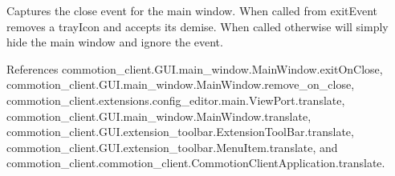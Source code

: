 \begin{DoxyVerb}Captures the close event for the main window. When called from exitEvent removes a trayIcon and accepts its demise. When called otherwise will simply hide the main window and ignore the event.
\end{DoxyVerb}
 

References commotion\+\_\+client.\+G\+U\+I.\+main\+\_\+window.\+Main\+Window.\+exit\+On\+Close, commotion\+\_\+client.\+G\+U\+I.\+main\+\_\+window.\+Main\+Window.\+remove\+\_\+on\+\_\+close, commotion\+\_\+client.\+extensions.\+config\+\_\+editor.\+main.\+View\+Port.\+translate, commotion\+\_\+client.\+G\+U\+I.\+main\+\_\+window.\+Main\+Window.\+translate, commotion\+\_\+client.\+G\+U\+I.\+extension\+\_\+toolbar.\+Extension\+Tool\+Bar.\+translate, commotion\+\_\+client.\+G\+U\+I.\+extension\+\_\+toolbar.\+Menu\+Item.\+translate, and commotion\+\_\+client.\+commotion\+\_\+client.\+Commotion\+Client\+Application.\+translate.



